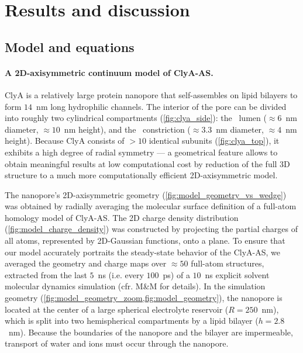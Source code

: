 \documentclass[journal=ancac3,manuscript=article,etalmode=truncate,maxauthors=0,layout=twocolumn]{achemso}
\begin{document}
\section{Results and discussion}\label{sect:results}

\subsection{Model and equations}



\paragraph{A 2D-axisymmetric continuum model of ClyA-AS.}
ClyA is a relatively large protein nanopore that self-assembles on lipid bilayers to form $14$~nm long 
hydrophilic channels. The interior of the pore can be divided into roughly two cylindrical compartments 
(\cref{fig:clya_side}): the \cis\ lumen ($\approx6$~nm diameter, $\approx10$~nm height), and the \trans\ 
constriction ($\approx3.3$~nm diameter, $\approx4$~nm height). Because ClyA consists of $>10$ identical 
subunits (\cref{fig:clya_top}), it exhibits a high degree of radial symmetry --- a geometrical feature allows 
to obtain meaningful results at low computational cost by reduction of the full 3D structure to a much more 
computationally efficient 2D-axisymmetric model.\cite{Pederson-2015,Lu-2012}  

The nanopore's 2D-axisymmetric geometry (\cref{fig:model_geometry_vs_wedge}) was obtained by radially 
averaging the molecular surface definition of a full-atom homology model of ClyA-AS. The 2D charge density 
distribution (\cref{fig:model_charge_density}) was constructed by projecting the partial charges of all 
atoms, represented by 2D-Gaussian functions, onto a plane. To ensure that our model accurately portraits the 
steady-state behavior of the ClyA-AS, we averaged the geometry and charge maps over $\approx50$ full-atom 
structures, extracted from the last $5$~ns (i.e. every $100$~ps) of a $10$~ns explicit solvent molecular 
dynamics simulation (cfr. M\&M for details). In the simulation geometry 
(\cref{fig:model_geometry_zoom,fig:model_geometry}), 
the nanopore is located at the center of a large spherical electrolyte reservoir ($R=250$~nm), which is split 
into two hemispherical compartments by a lipid bilayer ($h=2.8$~nm). Because the boundaries of the nanopore 
and the bilayer are impermeable, transport of water and ions must occur through the nanopore.
\end{document}
